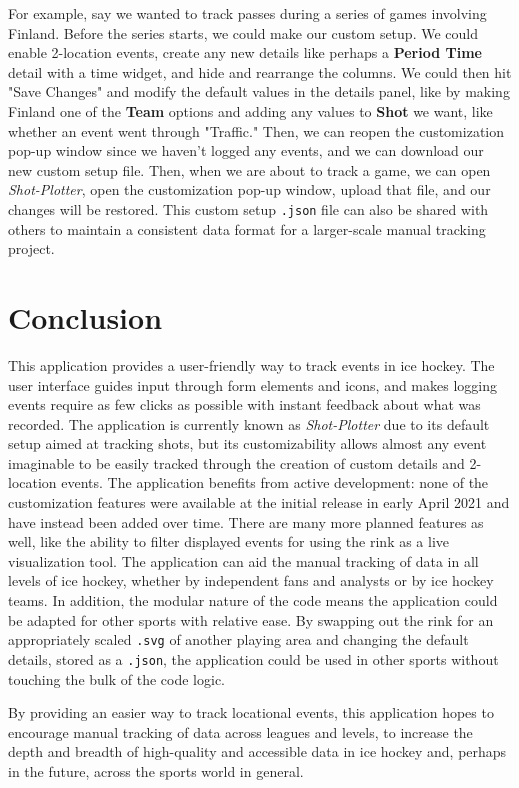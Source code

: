 \documentclass[letterpaper]{article}
\begin{document}
For example, say we wanted to track passes during a series of games involving Finland. Before the series starts, we could make our custom setup. We could enable 2-location events, create any new details like perhaps a \textbf{Period Time} detail with a time widget, and hide and rearrange the columns. We could then hit "Save Changes" and modify the default values in the details panel, like by making Finland one of the \textbf{Team} options and adding any values to \textbf{Shot} we want, like whether an event went through "Traffic." Then, we can reopen the customization pop-up window since we haven't logged any events, and we can download our new custom setup file. Then, when we are about to track a game, we can open \textit{Shot-Plotter}, open the customization pop-up window, upload that file, and our changes will be restored. This custom setup \texttt{.json} file can also be shared with others to maintain a consistent data format for a larger-scale manual tracking project.

\section{Conclusion}
This application provides a user-friendly way to track events in ice hockey. The user interface guides input through form elements and icons, and makes logging events require as few clicks as possible with instant feedback about what was recorded. The application is currently known as \textit{Shot-Plotter} due to its default setup aimed at tracking shots, but its customizability allows almost any event imaginable to be easily tracked through the creation of custom details and 2-location events. The application benefits from active development: none of the customization features were available at the initial release in early April 2021 and have instead been added over time. There are many more planned features as well, like the ability to filter displayed events for using the rink as a live visualization tool. The application can aid the manual tracking of data in all levels of ice hockey, whether by independent fans and analysts or by ice hockey teams. In addition, the modular nature of the code means the application could be adapted for other sports with relative ease. By swapping out the rink for an appropriately scaled \texttt{.svg} of another playing area and changing the default details, stored as a \texttt{.json}, the application could be used in other sports without touching the bulk of the code logic. 

By providing an easier way to track locational events, this application hopes to encourage manual tracking of data across leagues and levels, to increase the depth and breadth of high-quality and accessible data in ice hockey and, perhaps in the future, across the sports world in general.


\printbibliography
\end{document}
